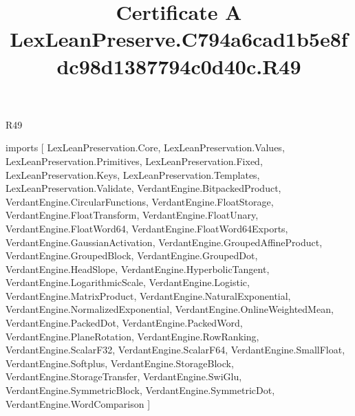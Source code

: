 \begin{lexlean}{R49}
\title{Certificate A LexLeanPreserve.C794a6cad1b5e8fdc98d1387794c0d40c.R49}
\begin{coremodule}
imports [
  LexLeanPreservation.Core,
  LexLeanPreservation.Values,
  LexLeanPreservation.Primitives,
  LexLeanPreservation.Fixed,
  LexLeanPreservation.Keys,
  LexLeanPreservation.Templates,
  LexLeanPreservation.Validate,
  VerdantEngine.BitpackedProduct,
  VerdantEngine.CircularFunctions,
  VerdantEngine.FloatStorage,
  VerdantEngine.FloatTransform,
  VerdantEngine.FloatUnary,
  VerdantEngine.FloatWord64,
  VerdantEngine.FloatWord64Exports,
  VerdantEngine.GaussianActivation,
  VerdantEngine.GroupedAffineProduct,
  VerdantEngine.GroupedBlock,
  VerdantEngine.GroupedDot,
  VerdantEngine.HeadSlope,
  VerdantEngine.HyperbolicTangent,
  VerdantEngine.LogarithmicScale,
  VerdantEngine.Logistic,
  VerdantEngine.MatrixProduct,
  VerdantEngine.NaturalExponential,
  VerdantEngine.NormalizedExponential,
  VerdantEngine.OnlineWeightedMean,
  VerdantEngine.PackedDot,
  VerdantEngine.PackedWord,
  VerdantEngine.PlaneRotation,
  VerdantEngine.RowRanking,
  VerdantEngine.ScalarF32,
  VerdantEngine.ScalarF64,
  VerdantEngine.SmallFloat,
  VerdantEngine.Softplus,
  VerdantEngine.StorageBlock,
  VerdantEngine.StorageTransfer,
  VerdantEngine.SwiGlu,
  VerdantEngine.SymmetricBlock,
  VerdantEngine.SymmetricDot,
  VerdantEngine.WordComparison
]


\end{coremodule}
\end{lexlean}
